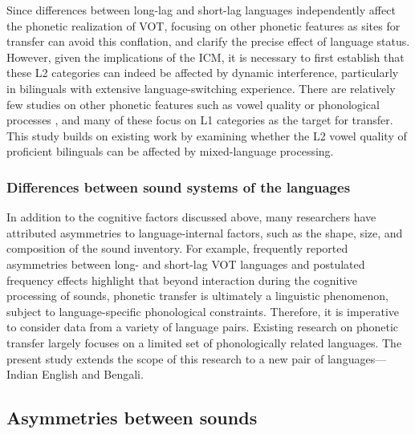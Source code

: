 \documentclass[12 pt]{article}
\begin{document}
Since differences between long-lag and short-lag languages independently affect the phonetic realization of VOT, focusing on other phonetic features as sites for transfer can avoid this conflation, and clarify the precise effect of language status. However, given the implications of the ICM, it is necessary to first establish that these L2 categories can indeed be affected by dynamic interference, particularly in bilinguals with extensive language-switching experience. There are relatively few studies on other phonetic features such as vowel quality \citep[see][]{simonet2014phonetic,muldner2019phonetics,elias2017effects} or phonological processes \citep[see][]{simonet2020increased,schwartz2015language}, and many of these focus on L1 categories as the target for transfer. %
This study builds on existing work by examining whether the L2 vowel quality of proficient bilinguals can be affected by mixed-language processing.

\subsubsection*{Differences between sound systems of the languages} \label{sound systems} In addition to the cognitive factors discussed above, many researchers have attributed asymmetries to language-internal factors, such as the shape, size, and composition of the sound inventory. For example, frequently reported asymmetries between long- and short-lag VOT languages \citep[see, e.g.][]{tobin2017phonetic, olson2016role,bullock2009trying,antoniou2011inter,chang2012rapid} and postulated frequency effects \citep{antoniou2011inter} highlight that beyond interaction during the cognitive processing of sounds, phonetic transfer is ultimately a linguistic phenomenon, subject to language-specific phonological constraints. Therefore, it is imperative to consider data from a variety of language pairs. Existing research on phonetic transfer largely focuses on a limited set of phonologically related languages. The present study extends the scope of this research to a new pair of languages--- Indian English and Bengali.


\subsection{Asymmetries between sounds}\label{asymmetry between sounds}
\end{document}
